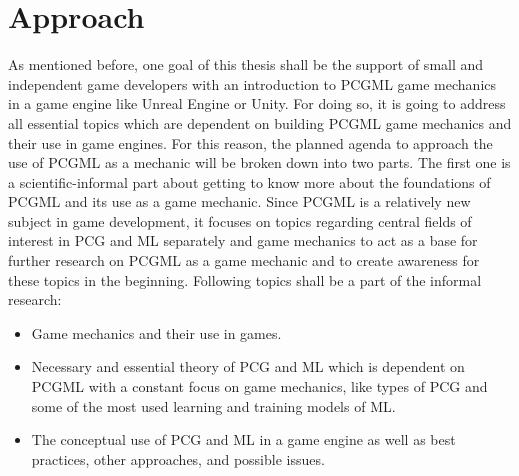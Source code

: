 \documentclass[MGS,Master,english]{twbook}%
\begin{document}
\section{Approach}
As mentioned before, one goal of this thesis shall be the support of small and independent game developers with an introduction to \ac{PCGML} game mechanics in a game engine like Unreal Engine or Unity. For doing so, it is going to address all essential topics which are dependent on building \ac{PCGML} game mechanics and their use in game engines. For this reason, the planned agenda to approach the use of \ac{PCGML} as a mechanic will be broken down into two parts. The first one is a scientific-informal part about getting to know more about the foundations of \ac{PCGML} and its use as a game mechanic. Since \ac{PCGML} is a relatively new subject in game development, it focuses on topics regarding central fields of interest in \ac{PCG} and \ac{ML} separately and game mechanics to act as a base for further research on \ac{PCGML} as a game mechanic and to create awareness for these topics in the beginning. Following topics shall be a part of the informal research:
\begin{itemize}
	\item Game mechanics and their use in games.
	\item Necessary and essential theory of \ac{PCG} and \ac{ML} which is dependent on \ac{PCGML} with a constant focus on game mechanics, like types of \ac{PCG} and some of the most used learning and training models of \ac{ML}.
	\item The conceptual use of \ac{PCG} and \ac{ML} in a game engine as well as best practices, other approaches, and possible issues.
\end{itemize}
\end{document}
